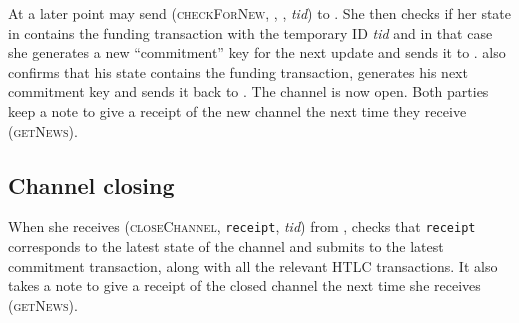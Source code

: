     At a later point \environment{} may send (\textsc{checkForNew}, \alice,
    \bob, \textit{tid}) to \alice. She then checks if her state in \ledger{}
    contains the funding transaction with the temporary ID \textit{tid} and in
    that case she generates a new ``commitment'' key for the next update and
    sends it to \bob. \bob{} also confirms that his state contains the funding
    transaction, generates his next commitment key and sends it back to \alice.
    The channel is now open. Both parties keep a note to give \environment{}
    a receipt of the new channel the next time they receive (\textsc{getNews}).

  \subsection{Channel closing}
    When she receives (\textsc{closeChannel}, \texttt{receipt}, \textit{tid})
    from \environment, \alice{} checks that \texttt{receipt} corresponds to the
    latest state of the channel and submits to \ledger{} the latest commitment
    transaction, along with all the relevant HTLC transactions. It also takes a
    note to give \environment{} a receipt of the closed channel the next time
    she receives (\textsc{getNews}).

